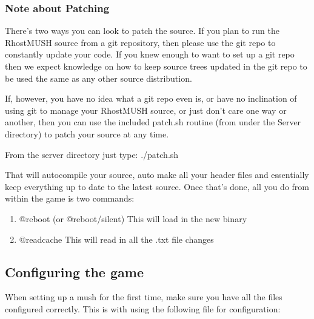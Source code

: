 \documentclass[letterpaper,10pt,english]{sphinxmanual}
\begin{document}
\subsubsection{Note about Patching}
\label{\detokenize{installation:note-about-patching}}
\sphinxAtStartPar
There’s two ways you can look to patch the source.  If you plan to run the
RhostMUSH source from a git repository, then please use the git repo to
constantly update your code.  If you knew enough to want to set up a git repo
then we expect knowledge on how to keep source trees updated in the git repo
to be used the same as any other source distribution.

\sphinxAtStartPar
If, however, you have no idea what a git repo even is, or have no inclination
of using git to manage your RhostMUSH source, or just don’t care one way
or another, then you can use the included patch.sh routine (from under the
Server directory) to patch your source at any time.

\sphinxAtStartPar
From the server directory just type: ./patch.sh

\sphinxAtStartPar
That will auto\sphinxhyphen{}compile your source, auto make all your header files and
essentially keep everything up to date to the latest source.
Once that’s done, all you do from within the game is two commands:
\begin{enumerate}
%
\item {} 
\sphinxAtStartPar
@reboot (or @reboot/silent)  \textendash{} This will load in the new binary

\item {} 
\sphinxAtStartPar
@readcache  \textendash{} This will read in all the .txt file changes

\end{enumerate}


\subsection{Configuring the game}
\label{\detokenize{installation:configuring-the-game}}
\sphinxAtStartPar
When setting up a mush for the first time, make sure you
have all the files configured correctly.  This is with using
the following file for configuration:

\begin{sphinxVerbatim}[commandchars=\\\{\}]
 
\end{sphinxVerbatim}
\end{document}
